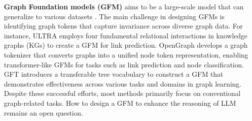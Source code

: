 \noindent\textbf{Graph Foundation models (GFM)} aims to be a large-scale model that can generalize to various datasets \cite{maoposition,liu2023towards}. The main challenge in designing GFMs is identifying graph tokens that capture invariance across diverse graph data. For instance, ULTRA \cite{galkintowards} employs four fundamental relational interactions in knowledge graphs (KGs) to create a GFM for link prediction. OpenGraph \cite{xia2024opengraph} develops a graph tokenizer that converts graphs into a unified node token representation, enabling transformer-like GFMs for tasks such as link prediction and node classification. GFT \cite{wang2024gft} introduces a transferable tree vocabulary to construct a GFM that demonstrates effectiveness across various tasks and domains in graph learning. Despite these successful efforts, most methods primarily focus on conventional graph-related tasks. How to design a GFM to enhance the reasoning of LLM remains an open question.

